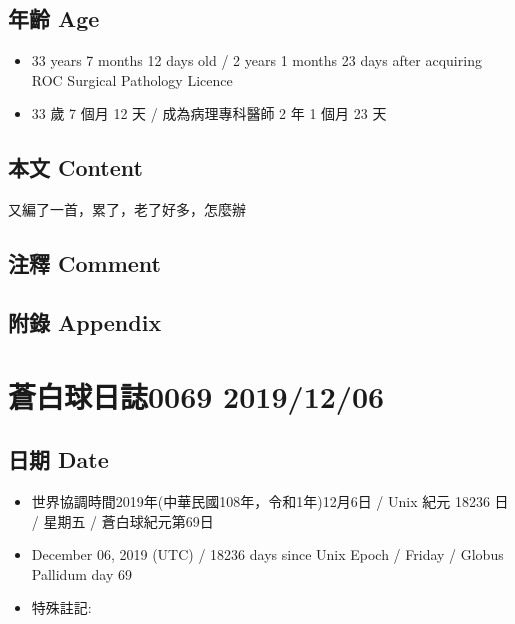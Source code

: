 \documentclass[
]{article}
\providecommand{\tightlist}{%
  \setlength{\itemsep}{0pt}\setlength{\parskip}{0pt}}
\begin{document}
\hypertarget{ux5e74ux9f61-age-4}{%
\subsection{年齡 Age}\label{ux5e74ux9f61-age-4}}

\begin{itemize}
\tightlist
\item
  33 years 7 months 12 days old / 2 years 1 months 23 days after
  acquiring ROC Surgical Pathology Licence
\item
  33 歲 7 個月 12 天 / 成為病理專科醫師 2 年 1 個月 23 天
\end{itemize}

\hypertarget{ux672cux6587-content-4}{%
\subsection{本文 Content}\label{ux672cux6587-content-4}}

又編了一首，累了，老了好多，怎麼辦

\hypertarget{ux6ce8ux91cb-comment-4}{%
\subsection{注釋 Comment}\label{ux6ce8ux91cb-comment-4}}

\hypertarget{ux9644ux9304-appendix-4}{%
\subsection{附錄 Appendix}\label{ux9644ux9304-appendix-4}}

\hypertarget{ux84bcux767dux7403ux65e5ux8a8c0069-20191206}{%
\section{蒼白球日誌0069
2019/12/06}\label{ux84bcux767dux7403ux65e5ux8a8c0069-20191206}}

\hypertarget{ux65e5ux671f-date-5}{%
\subsection{日期 Date}\label{ux65e5ux671f-date-5}}

\begin{itemize}
\tightlist
\item
  世界協調時間2019年(中華民國108年，令和1年)12月6日 / Unix 紀元 18236 日
  / 星期五 / 蒼白球紀元第69日
\item
  December 06, 2019 (UTC) / 18236 days since Unix Epoch / Friday /
  Globus Pallidum day 69
\item
  特殊註記:
\end{itemize}
\end{document}
